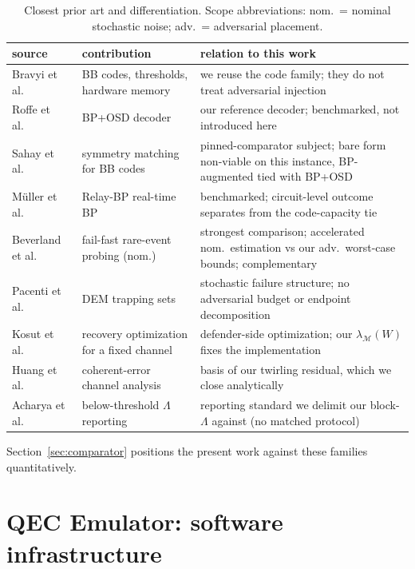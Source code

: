 \documentclass[11pt,a4paper]{article}
\begin{document}
\begin{table}[H]\centering\small
\caption{Closest prior art and differentiation. Scope abbreviations:
  nom.\ = nominal stochastic noise; adv.\ = adversarial placement.}
\label{tab:priorart}
\begin{tabular}{@{}p{}p{}p{}@{}}
\toprule
source & contribution & relation to this work \\\midrule
Bravyi et al.\ \cite{Bravyi2024} & BB codes, thresholds, hardware memory & we reuse the code family; they do not treat adversarial injection \\
Roffe et al.\ \cite{Roffe2020} & BP+OSD decoder & our reference decoder; benchmarked, not introduced here \\
Sahay et al.\ \cite{SahayBrown2026} & symmetry matching for BB codes & pinned-comparator subject; bare form non-viable on this instance, BP-augmented tied with BP+OSD \\
M\"uller et al.\ \cite{Muller2025relay} & Relay-BP real-time BP & benchmarked; circuit-level outcome separates from the code-capacity tie \\
Beverland et al.\ \cite{beverland2025failfast} & fail-fast rare-event probing (nom.) & strongest comparison; accelerated nom.\ estimation vs our adv.\ worst-case bounds; complementary \\
Pacenti et al.\ \cite{Pacenti2026trapping} & DEM trapping sets & stochastic failure structure; no adversarial budget or endpoint decomposition \\
Kosut et al.\ \cite{kosut2008robust} & recovery optimization for a fixed channel & defender-side optimization; our $\lambda_{\mathcal{M}}(W)$ fixes the implementation \\
Huang et al.\ \cite{huang2019coherent} & coherent-error channel analysis & basis of our twirling residual, which we close analytically \\
Acharya et al.\ \cite{Acharya2024lambda} & below-threshold $\Lambda$ reporting & reporting standard we delimit our block-$\Lambda$ against (no matched protocol) \\
\bottomrule
\end{tabular}
\end{table}
Section~\ref{sec:comparator} positions the present work against these
families quantitatively.

\section{QEC Emulator: software infrastructure}
\label{sec:emulator}
\end{document}
